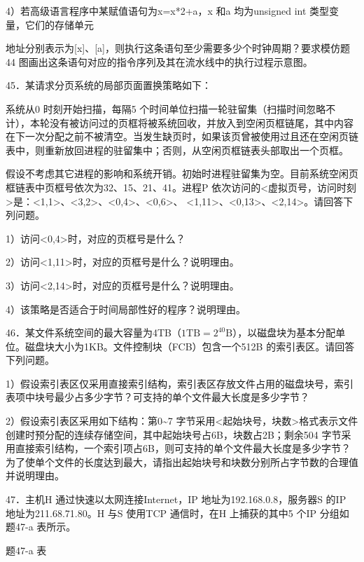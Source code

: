 \documentclass[UTF8,11pt]{ctexart}
\begin{document}
4）若高级语言程序中某赋值语句为x=x*2+a，x 和a 均为unsigned int 类型变量，它们的存储单元


地址分别表示为[x]、[a]，则执行这条语句至少需要多少个时钟周期？要求模仿题44 图画出这条语句对应的指令序列及其在流水线中的执行过程示意图。


45．某请求分页系统的局部页面置换策略如下：


系统从0 时刻开始扫描，每隔5 个时间单位扫描一轮驻留集（扫描时间忽略不计），本轮没有被访问过的页框将被系统回收，并放入到空闲页框链尾，其中内容在下一次分配之前不被清空。当发生缺页时，如果该页曾被使用过且还在空闲页链表中，则重新放回进程的驻留集中；否则，从空闲页框链表头部取出一个页框。


假设不考虑其它进程的影响和系统开销。初始时进程驻留集为空。目前系统空闲页框链表中页框号依次为32、15、21、41。进程P 依次访问的<虚拟页号，访问时刻>是：<1,1>、<3,2>、<0,4>、<0,6>、 <1,11>、<0,13>、<2,14>。请回答下列问题。


1）访问<0,4>时，对应的页框号是什么？


2）访问<1,11>时，对应的页框号是什么？说明理由。


3）访问<2,14>时，对应的页框号是什么？说明理由。


4）该策略是否适合于时间局部性好的程序？说明理由。


46．某文件系统空间的最大容量为4TB（\(\displaystyle 1\mathrm{TB}=2^{40}\mathrm{B}\)），以磁盘块为基本分配单位。磁盘块大小为1KB。文件控制块（FCB）包含一个512B 的索引表区。请回答下列问题。


1）假设索引表区仅采用直接索引结构，索引表区存放文件占用的磁盘块号，索引表项中块号最少占多少字节？可支持的单个文件最大长度是多少字节？


2）假设索引表区采用如下结构：第0\textasciitilde{}7 字节采用<起始块号，块数>格式表示文件创建时预分配的连续存储空间，其中起始块号占6B，块数占2B；剩余504 字节采用直接索引结构，一个索引项占6B，则可支持的单个文件最大长度是多少字节？为了使单个文件的长度达到最大，请指出起始块号和块数分别所占字节数的合理值并说明理由。


47．主机H 通过快速以太网连接Internet，IP 地址为192.168.0.8，服务器S 的IP 地址为211.68.71.80。H 与S 使用TCP 通信时，在H 上捕获的其中5 个IP 分组如 题47-a 表所示。


题47-a 表
\end{document}
